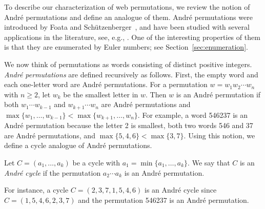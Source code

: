 To describe our characterization of web permutations, we review the notion of
Andr\'e permutations and define an analogue of them.
Andr\'e permutations were introduced by Foata and Sch\"utzenberger~\cite{FSch73},
and have been studied with several applications in the literature, see, e.g., \cite{Sta94, FH16}.
One of the interesting properties of them is that they are enumerated by Euler numbers;
see Section~\ref{sec:enumeration}.

We now think of permutations as words consisting of distinct positive integers.
\emph{Andr\'e permutations} are defined recursively as follows.
First, the empty word and each one-letter word are Andr\'e permutations.
For a permutation \( w=w_1 w_2 \cdots w_n \) with \( n\ge 2 \), 
let \( w_k \) be the smallest letter in \( w \). Then \( w \) is an Andr\'e
permutation if both \( w_1 \cdots w_{k-1} \) and \( w_{k+1}\cdots w_{n} \) are 
Andr\'e permutations and \( \max\{w_1,\dots,w_{k-1}\} < \max\{w_{k+1},\dots,w_n\} \).
For example, a word 546237 is an Andr\'e permutation because
the letter 2 is smallest, both two words 546 and 37 are Andr\'e permutations,
and \( \max\{5,4,6\}<\max\{3,7\} \).
Using this notion, we define a cycle analogue of Andr\'e permutations.
\begin{defn} \label{def:Andre cycle}
  Let \( C=(a_1,\dots,a_k) \) be a cycle with \( a_1 = \min \{a_1,\dots,a_k\} \).
  We say that \( C \) is an \emph{Andr\'e cycle}
  if the permutation \( a_2\cdots a_k \) is an Andr\'e permutation.
\end{defn}
For instance, a cycle \( C = (2,3,7,1,5,4,6) \) is an Andr\'e cycle
since \( C = (1,5,4,6,2,3,7) \) and the permutation 546237 is an Andr\'e permutation.


